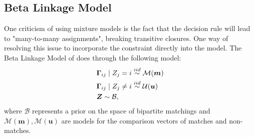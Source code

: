 \documentclass[12pt,letterpaper]{article}
\newcommand{\1}[1]{\mathbb{I}\!\left[#1\right]} %
\begin{document}
{%

\subsection{Beta Linkage Model}
One criticism of using mixture models is the fact that the decision rule will lead to "many-to-many assignments", breaking transitive closures. One way of resolving this issue to incorporate the constraint directly into the model. The Beta Linkage Model of \cite{sadinle_bayesian_2017} does through the following model: 
\begin{align}
	&\bm{\Gamma}_{ij} \mid Z_j =i \stackrel{iid}{\sim} \mathcal{M}(\bm{m})  \\
	&\bm{\Gamma}_{ij} \mid Z_j \neq i \stackrel{iid}{\sim} \mathcal{U}(\bm{u}) \notag \\
	& \bm{Z} \sim \mathcal{B}, \notag
\end{align}
where $\mathcal{B}$ represents a prior on the space of bipartite matchings and $\mathcal{M}(\bm{m}), \mathcal{M}(\bm{u})$ are models for the comparison vectors of matches and non-matches.

}
\end{document}
